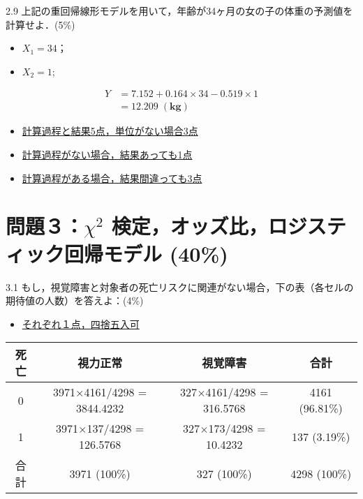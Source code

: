 \documentclass[11pt,]{problemset}
\providecommand{\tightlist}{%
  \setlength{\itemsep}{0pt}\setlength{\parskip}{0pt}}
\begin{document}
2.9
上記の重回帰線形モデルを用いて，年齢が34ヶ月の女の子の体重の予測値を計算せよ．(5\%)

\begin{itemize}
\tightlist
\item
  \(X_1 = 34\)；
\item
  \(X_2 = 1\);
\end{itemize}

\[
\begin{aligned}
Y & = 7.152 + 0.164 \times 34 -0.519\times 1 \\
  & = 12.209\; \mathbf{(kg)}
\end{aligned}
\]

\begin{itemize}
\item
  \underline{計算過程と結果5点，単位がない場合3点}
\item
  \underline{計算過程がない場合，結果あっても1点}
\item
  \underline{計算過程がある場合，結果間違っても3点}
\end{itemize}

\newpage

\hypertarget{chi2--40}{%
\section{\texorpdfstring{問題３：\(\chi^2\)
検定，オッズ比，ロジスティック回帰モデル
(40\%)}{問題３：\textbackslash{}chi\^{}2 検定，オッズ比，ロジスティック回帰モデル (40\%)}}\label{chi2--40}}

3.1
もし，視覚障害と対象者の死亡リスクに関連がない場合，下の表（各セルの期待値の人数）を答えよ：(4\%)

\begin{itemize}
\item
  \underline{それぞれ１点，四捨五入可}
\end{itemize}

\begin{center}
\begin{tabular}{|c|c|c|c|}
\hline
死亡 & 視力正常                     & 視覚障害                   & 合計             \\ \hline
0  & 3971$\times$4161/4298 = 3844.4232 & 327$\times$4161/4298 = 316.5768 & 4161 (96.81\%) \\ \hline
1  & 3971$\times$137/4298 = 126.5768   & 327$\times$173/4298 = 10.4232   & 137 (3.19\%)   \\ \hline
合計 & 3971 (100\%)             & 327 (100\%)            & 4298 (100\%)   \\ \hline
\end{tabular}
\end{center}
\end{document}
